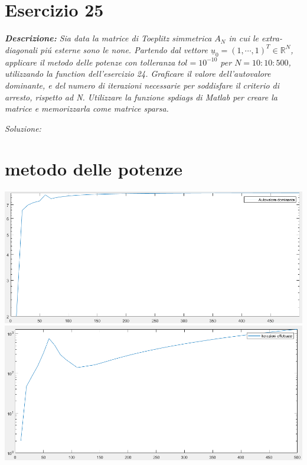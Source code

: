 \section{Esercizio 25}

\textit{\textbf{Descrizione:}  Sia data la matrice di Toeplitz simmetrica $A_{N}$ in cui le extra-diagonali pi\'u esterne sono le none. Partendo dal vettore $\underline{u}_{0} = (1, \cdots,1)^{T} \in \mathbb{R}^{N}$, applicare il metodo delle potenze con tolleranza $tol=10^{-10}$ per $N=10:10:500$, utilizzando la function dell'esercizio 24. Graficare il valore dell'autovalore dominante, e del numero di iterazioni necessarie per soddisfare il criterio di arresto, rispetto ad N. Utilizzare la funzione spdiags di Matlab per creare la matrice e memorizzarla come matrice sparsa.}

\noindent\emph{Soluzione: }\newline
\section*{metodo delle potenze}
\newpage

\includegraphics[width=1\linewidth]{img/autovalore.png}
\includegraphics[width=1\linewidth]{img/iterazioniPotenze.png}
